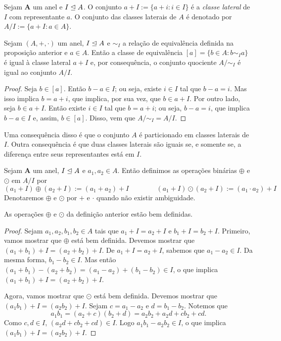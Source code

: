 \begin{defi}
	Sejam $\bm A$ um anel e $I \mathrel{\unlhd} A$. O conjunto $a+I := \{a+i : i \in I\}$ é a \emph{classe lateral} de $I$ com representante $a$. O conjunto das classes laterais de $A$ é denotado por $A/I := \{a+I : a \in A\}$.
\end{defi}

\begin{prop}
	Sejam $(A,+,\cdot)$ um anel, $I \mathrel{\unlhd} A$ e $\sim_I$ a relação de equivalência definida na proposição anterior e $a \in A$. Então a classe de equivalência $[a]=\{b \in A : b \sim_I a\}$ é igual à classe lateral $a+I$ e, por consequência, o conjunto quociente $A/\sim_I$ é igual ao conjunto $A/I$.
\end{prop}
\begin{proof}
	Seja $b \in [a]$. Então $b-a \in I$; ou seja, existe $i \in I$ tal que $b-a=i$. Mas isso implica $b=a+i$, que implica, por sua vez, que $b \in a+I$. Por outro lado, seja $b \in a+I$. Então existe $i \in I$ tal que $b=a+i$; ou seja, $b-a=i$, que implica $b-a \in I$ e, assim, $b \in [a]$. Disso, vem que $A/\sim_I = A/I$.
\end{proof}

	Uma consequência disso é que o conjunto $A$ é particionado em classes laterais de $I$. Outra consequência é que duas classes laterais são iguais se, e somente se, a diferença entre seus representantes está em $I$.

\begin{defi}
	Sejam $\bm A$ um anel, $I \mathrel{\unlhd} A$ e $a_1,a_2 \in A$. Então definimos as operações binárias $\oplus$ e $\odot$ em $A/I$ por
	\begin{equation*}
	(a_1+I) \oplus (a_2+I) := (a_1+a_2)+I \qquad \qquad (a_1+I) \odot (a_2+I) := (a_1 \cdot a_2)+I
	\end{equation*}
Denotaremos $\oplus$ e $\odot$ por $+$ e $\cdot$ quando não existir ambiguidade.
\end{defi}

\begin{prop}
	As operações $\oplus$ e $\odot$ da definição anterior estão bem definidas.
\end{prop}
\begin{proof}
	Sejam $a_1,a_2,b_1,b_2 \in A$ tais que $a_1+I=a_2+I$ e $b_1+I=b_2+I$. Primeiro, vamos mostrar que $\oplus$ está bem definida. Devemos mostrar que $(a_1+b_1)+I=(a_2+b_2)+I$. De $a_1+I=a_2+I$, sabemos que $a_1-a_2 \in I$. Da mesma forma, $b_1-b_2 \in I$. Mas então $(a_1+b_1)-(a_2+b_2) = (a_1-a_2)+(b_1-b_2) \in I$, o que implica $(a_1+b_1)+I=(a_2+b_2)+I$.

	Agora, vamos mostrar que $\odot$ está bem definida. Devemos mostrar que $(a_1b_1)+I=(a_2b_2)+I$. Sejam $c=a_1-a_2$ e $d=b_1-b_2$. Notemos que
	\begin{equation*}
	a_1b_1 = (a_2+c)(b_2+d) = a_2b_2 + a_2d + cb_2 + cd.
	\end{equation*}
Como $c,d \in I$, $(a_2d + cb_2 + cd) \in I$. Logo $a_1b_1-a_2b_2 \in I$, o que implica $(a_1b_1)+I=(a_2b_2)+I$.
\end{proof}

